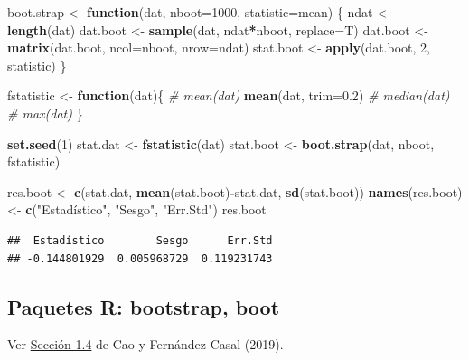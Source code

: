 \documentclass[
]{book}
\newenvironment{Shaded}{\begin{snugshade}}{\end{snugshade}}
\newcommand{\CommentTok}[1]{\textcolor[rgb]{0.56,0.35,0.01}{\textit{#1}}}
\newcommand{\ControlFlowTok}[1]{\textcolor[rgb]{0.13,0.29,0.53}{\textbf{#1}}}
\newcommand{\DataTypeTok}[1]{\textcolor[rgb]{0.13,0.29,0.53}{#1}}
\newcommand{\DecValTok}[1]{\textcolor[rgb]{0.00,0.00,0.81}{#1}}
\newcommand{\FloatTok}[1]{\textcolor[rgb]{0.00,0.00,0.81}{#1}}
\newcommand{\KeywordTok}[1]{\textcolor[rgb]{0.13,0.29,0.53}{\textbf{#1}}}
\newcommand{\NormalTok}[1]{#1}
\newcommand{\OperatorTok}[1]{\textcolor[rgb]{0.81,0.36,0.00}{\textbf{#1}}}
\newcommand{\StringTok}[1]{\textcolor[rgb]{0.31,0.60,0.02}{#1}}
\theoremstyle{break}
\theoremstyle{definition}
\theoremstyle{definition}
\theoremstyle{definition}
\theoremstyle{remark}
\begin{document}
\begin{Shaded}
\begin{Highlighting}[]
\NormalTok{boot.strap <-}\StringTok{ }\ControlFlowTok{function}\NormalTok{(dat, }\DataTypeTok{nboot=}\DecValTok{1000}\NormalTok{, }\DataTypeTok{statistic=}\NormalTok{mean)}
\NormalTok{\{}
\NormalTok{  ndat <-}\StringTok{ }\KeywordTok{length}\NormalTok{(dat)}
\NormalTok{  dat.boot <-}\StringTok{ }\KeywordTok{sample}\NormalTok{(dat, ndat}\OperatorTok{*}\NormalTok{nboot, }\DataTypeTok{replace=}\NormalTok{T)}
\NormalTok{  dat.boot <-}\StringTok{ }\KeywordTok{matrix}\NormalTok{(dat.boot, }\DataTypeTok{ncol=}\NormalTok{nboot, }\DataTypeTok{nrow=}\NormalTok{ndat)}
\NormalTok{  stat.boot <-}\StringTok{ }\KeywordTok{apply}\NormalTok{(dat.boot, }\DecValTok{2}\NormalTok{, statistic)}
\NormalTok{\}}

\NormalTok{fstatistic <-}\StringTok{ }\ControlFlowTok{function}\NormalTok{(dat)\{}
  \CommentTok{#  mean(dat)}
  \KeywordTok{mean}\NormalTok{(dat, }\DataTypeTok{trim=}\FloatTok{0.2}\NormalTok{)}
  \CommentTok{#  median(dat)}
  \CommentTok{#  max(dat)}
\NormalTok{\}}

\KeywordTok{set.seed}\NormalTok{(}\DecValTok{1}\NormalTok{)}
\NormalTok{stat.dat <-}\StringTok{ }\KeywordTok{fstatistic}\NormalTok{(dat)}
\NormalTok{stat.boot <-}\StringTok{ }\KeywordTok{boot.strap}\NormalTok{(dat, nboot, fstatistic)}

\NormalTok{res.boot <-}\StringTok{ }\KeywordTok{c}\NormalTok{(stat.dat, }\KeywordTok{mean}\NormalTok{(stat.boot)}\OperatorTok{-}\NormalTok{stat.dat, }\KeywordTok{sd}\NormalTok{(stat.boot))}
\KeywordTok{names}\NormalTok{(res.boot) <-}\StringTok{ }\KeywordTok{c}\NormalTok{(}\StringTok{"Estadístico"}\NormalTok{, }\StringTok{"Sesgo"}\NormalTok{, }\StringTok{"Err.Std"}\NormalTok{)}
\NormalTok{res.boot}
\end{Highlighting}
\end{Shaded}

\begin{verbatim}
##  Estadístico        Sesgo      Err.Std 
## -0.144801929  0.005968729  0.119231743
\end{verbatim}

\hypertarget{paquetes-r-bootstrap-boot}{%
\subsection{Paquetes R: bootstrap, boot}\label{paquetes-r-bootstrap-boot}}

Ver \href{https://rubenfcasal.github.io/book_remuestreo/cap1-paquetes.html}{Sección 1.4} de Cao y Fernández-Casal (2019).
\end{document}
